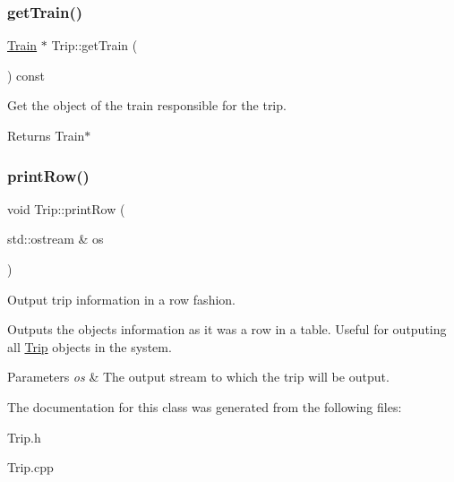 \subsubsection{\texorpdfstring{get\+Train()}{getTrain()}}
{\footnotesize\ttfamily \mbox{\hyperlink{classTrain}{Train}} $\ast$ Trip\+::get\+Train (\begin{DoxyParamCaption}{ }\end{DoxyParamCaption}) const}



Get the object of the train responsible for the trip. 

\begin{DoxyReturn}{Returns}
Train$\ast$ 
\end{DoxyReturn}
\mbox{\label{classTrip_a233bab5c803f51ee5e79c611a15699c0}} 
\subsubsection{\texorpdfstring{print\+Row()}{printRow()}}
{\footnotesize\ttfamily void Trip\+::print\+Row (\begin{DoxyParamCaption}\item[{std\+::ostream \&}]{os }\end{DoxyParamCaption})}



Output trip information in a row fashion. 

Outputs the object\textquotesingle{}s information as it was a row in a table. Useful for outputing all \mbox{\hyperlink{classTrip}{Trip}} objects in the system.


\begin{DoxyParams}{Parameters}
{\em os} & The output stream to which the trip will be output. \\
\hline
\end{DoxyParams}


The documentation for this class was generated from the following files\+:\begin{DoxyCompactItemize}
\item 
Trip.\+h\item 
Trip.\+cpp\end{DoxyCompactItemize}
